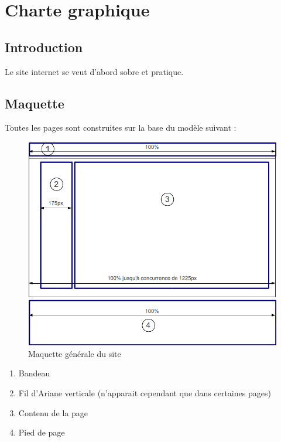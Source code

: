 \documentclass[letter, 11pt]{report}
\begin{document}
\section{Charte graphique}

\subsection{Introduction}

Le site internet se veut d'abord sobre et pratique.

\subsection{Maquette}

Toutes les pages sont construites sur la base du modèle suivant :

\begin{figure}[htbp]
	\begin{center}
		\includegraphics[scale=0.6]{maquetteImage.png}
	\end{center}
	\caption{Maquette générale du site}
\end{figure}

\begin{enumerate}
	\item Bandeau
	\item Fil d'Ariane verticale (n'apparait cependant que dans certaines pages)
	\item Contenu de la page
	\item Pied de page
\end{enumerate}
\end{document}
